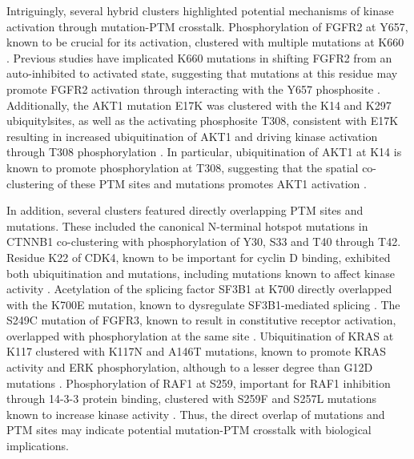 Intriguingly, several hybrid clusters highlighted potential mechanisms of kinase activation through mutation-PTM crosstalk. Phosphorylation of FGFR2 at Y657, known to be crucial for its activation, clustered with multiple mutations at K660 \cite{chenh_mohammadim:MolecularBrake2007}. Previous studies have implicated K660 mutations in shifting FGFR2 from an auto-inhibited to activated state, suggesting that mutations at this residue may promote FGFR2 activation through interacting with the Y657 phosphosite \cite{greulichh_pollockpm:TargetingMutant2011}. Additionally, the AKT1 mutation E17K was clustered with the K14 and K297 ubiquitylsites, as well as the activating phosphosite T308, consistent with E17K resulting in increased ubiquitination of AKT1 and driving kinase activation through T308 phosphorylation \cite{yangwl_linhk:RegulationAkt2010}. In particular, ubiquitination of AKT1 at K14 is known to promote phosphorylation at T308, suggesting that the spatial co-clustering of these PTM sites and mutations promotes AKT1 activation \cite{yangwl_linhk:E3Ligase2009}.

In addition, several clusters featured directly overlapping PTM sites and mutations. These included the canonical N-terminal hotspot mutations in CTNNB1 co-clustering with phosphorylation of Y30, S33 and T40 through T42. Residue K22 of CDK4, known to be important for cyclin D binding, exhibited both ubiquitination and mutations, including mutations known to affect kinase activity \cite{lij_tsaimd:DissectionCDK4Binding2005}. Acetylation of the splicing factor SF3B1 at K700 directly overlapped with the K700E mutation, known to dysregulate SF3B1-mediated splicing \cite{obengea_ebertbl:PhysiologicExpression2016}. The S249C mutation of FGFR3, known to result in constitutive receptor activation, overlapped with phosphorylation at the same site \cite{limanc_huangph:TargetingSrc2020}. Ubiquitination of KRAS at K117 clustered with K117N and A146T mutations, known to promote KRAS activity and ERK phosphorylation, although to a lesser degree than G12D mutations \cite{stolzeb_schollc:ComparativeAnalysis2015,janakiramanm_solitdb:GenomicBiological2010}. Phosphorylation of RAF1 at S259, important for RAF1 inhibition through 14-3-3 protein binding, clustered with S259F and S257L mutations known to increase kinase activity \cite{panditb_gelbbd:GainoffunctionRAF12007}. Thus, the direct overlap of mutations and PTM sites may indicate potential mutation-PTM crosstalk with biological implications.

